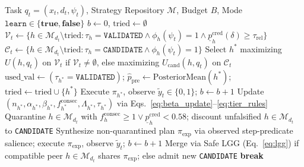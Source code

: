 \documentclass[10pt,letterpaper]{article}
\begin{document}
\begin{algorithm}[t]
\small
\caption{EVSA Closed-Loop Decision, Safe-LGG Validation, and Selective Drift Quarantine}
\label{alg:evsa}
\begin{algorithmic}[1]
\Require Task $q_t = (x_t, d_t, \psi_t)$, Strategy Repository $\mathcal{M}$, Budget $B$, Mode $\texttt{learn} \in \{\textbf{true}, \textbf{false}\}$
\State $b \leftarrow 0$, $\text{tried} \leftarrow \emptyset$
  \State $\mathcal{V}_t \leftarrow \{h \in \mathcal{M}_{d_t} \setminus \text{tried} : \tau_h = \texttt{VALIDATED} \land \phi_h(\psi_t) = 1 \land \underline{p}_h^{\mathrm{cred}}(\delta) \ge \tau_{\mathrm{rel}}\}$
  \State $\mathcal{C}_t \leftarrow \{h \in \mathcal{M}_{d_t} \setminus \text{tried} : \tau_h = \texttt{CANDIDATE} \land \phi_h(\psi_t) = 1\}$
    \State Select $h^*$ maximizing $U(h, q_t)$ on $\mathcal{V}_t$ if $\mathcal{V}_t \neq \emptyset$, else maximizing $U_{\mathrm{cand}}(h, q_t)$ on $\mathcal{C}_t$
    \State $\text{used\_val} \leftarrow (\tau_{h^*} = \texttt{VALIDATED})$; \quad $\hat{p}_{\mathrm{pre}} \leftarrow \text{PosteriorMean}(h^*)$; \quad $\text{tried} \leftarrow \text{tried} \cup \{h^*\}$
    \State Execute $\pi_{h^*}$, observe $\tilde{y}_t \in \{0,1\}$; \quad $b \leftarrow b + 1$
      \State Update $(n_{h^*}, \alpha_{h^*}, \beta_{h^*}, f_{h^*}^{\mathrm{consec}}, \Lambda_{h^*}, \tau_{h^*})$ via Eqs.~\eqref{eq:beta_update}--\eqref{eq:tier_rules}
        \State Quarantine $h \in \mathcal{M}_{d_t}$ with $f_h^{\mathrm{consec}} \ge 1 \lor \underline{p}_h^{\mathrm{cred}} < 0.58$; discount unfalsified $h \in \mathcal{M}_{d_t}$ to \texttt{CANDIDATE}
      \EndIf
    \EndIf
  \Else
    \State Synthesize non-quarantined plan $\pi_{\mathrm{exp}}$ via observed step-predicate salience; execute $\pi_{\mathrm{exp}}$, observe $\tilde{y}_t$; $b \leftarrow b + 1$
      \State Merge via Safe LGG (Eq.~\eqref{eq:lgg}) if compatible peer $h \in \mathcal{M}_{d_t}$ shares $\pi_{\mathrm{exp}}$; else admit new \texttt{CANDIDATE}
    \EndIf
  \EndIf
   \textbf{break} \EndIf
\EndWhile
\end{algorithmic}
\end{algorithm}

\end{document}
